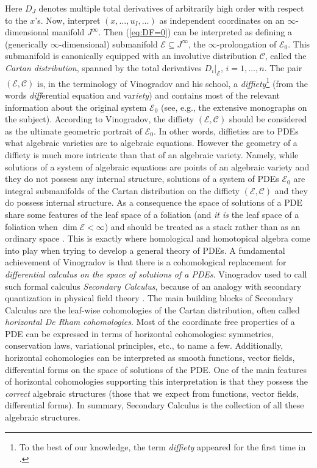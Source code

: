 \documentclass{conm-p-l}
\theoremstyle{definition}
\theoremstyle{remark}
\numberwithin{equation}{section}
\begin{document}
Here $D_J$ denotes multiple total derivatives of arbitrarily high order with respect to the $x$'s. Now, interpret $(x, \ldots, u_I, \ldots)$ as independent coordinates on an $\infty$-dimensional manifold $J^\infty$. Then (\ref{eq:DF=0}) can be interpreted as defining a (generically $\infty$-dimensional) submanifold $\mathscr E \subseteq J^\infty$, the $\infty$-prolongation of $\mathscr E_0$. This submanifold is canonically equipped with an involutive distribution $\mathscr C$, called the \emph{Cartan distribution}, spanned by the total derivatives $D_i|_{\mathscr E}$, $i =1, \ldots, n$. The pair $(\mathscr E, \mathscr C)$ is, in the terminology of Vinogradov and his school, a \emph{diffiety}\footnote{To the best of our knowledge, the term \emph{diffiety} appeared for the first time in \cite{Vin1984}.} (from the words \emph{diff}erential equation and var\emph{iety}) and contains most of the relevant information about the original system $\mathscr E_0$ (see, e.g., the extensive monographs \cite{b...99, kv98, v01} on the subject). According to Vinogradov, the diffiety $(\mathscr E, \mathscr C)$ should be considered as the ultimate geometric portrait of $\mathscr E_0$. In other words, diffieties are to PDEs what algebraic varieties are to algebraic equations. However the geometry of a diffiety is much more intricate than that of an algebraic variety. Namely, while solutions of a system of algebraic equations are points of an algebraic variety and they do not possess any internal structure, solutions of a system of PDEs $\mathscr E_0$ are integral submanifolds of the Cartan distribution on the diffiety $(\mathscr E, \mathscr C)$ and they do possess internal structure. As a consequence the space of solutions of a PDE share some features of the leaf space of a foliation (and \emph{it is} the leaf space of a foliation when $\dim \mathscr E < \infty$) and should be treated as a stack rather than as an ordinary space \cite{mm03, BX2011, dH2013}. This is exactly where homological and homotopical algebra come into play when trying to develop a general theory of PDEs. A fundamental achievement of Vinogradov is that there is a cohomological replacement for \emph{differential calculus on the space of solutions of a PDEs}. Vinogradov used to call such formal calculus \emph{Secondary Calculus}, because of an analogy with secondary quantization in physical field theory \cite{v98, b...99, v01}. The main building blocks of Secondary Calculus are the leaf-wise cohomologies of the Cartan distribution, often called \emph{horizontal De Rham cohomologies}. Most of the coordinate free properties of a PDE can be expressed in terms of horizontal cohomologies: symmetries, conservation laws, variational principles, etc., to name a few. Additionally, horizontal cohomologies can be interpreted as smooth functions, vector fields, differential forms on the space of solutions of the PDE. One of the main features of horizontal cohomologies supporting this interpretation is that they possess the \emph{correct} algebraic structures (those that we expect from functions, vector fields, differential forms). In summary, Secondary Calculus is the collection of all these algebraic structures. 
\end{document}
